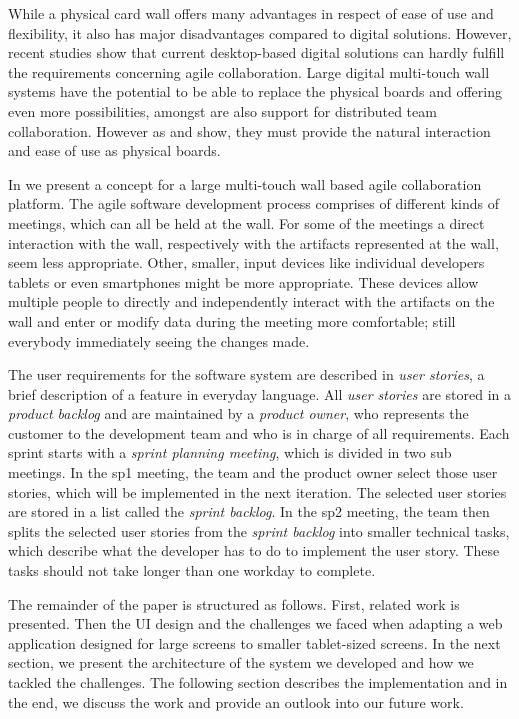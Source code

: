 \documentclass{sigchi}
\begin{document}
While a physical card wall offers many advantages in respect of ease of use and flexibility, it also has major disadvantages compared to digital solutions. However, recent studies \cite{udcw:31721, Mateescu:2015} show that current desktop-based digital solutions can hardly fulfill the requirements concerning agile collaboration.
Large digital multi-touch wall systems have the potential to be able to replace the physical boards and offering even more possibilities, amongst are also support for distributed team collaboration. However as \cite{udcw:31721} and \cite{Mateescu:2015} show, they must provide the natural interaction and ease of use as physical boards. 

In \cite{Mateescu:2015} we present a concept for a large multi-touch wall based agile collaboration platform. The agile software development process comprises of different kinds of meetings, which can all be held at the wall. For some of the meetings a direct interaction with the wall, respectively with the artifacts represented at the wall, seem less appropriate. Other, smaller, input devices like individual developers tablets or even smartphones might be more appropriate. These devices allow multiple people to directly and independently interact with the artifacts on the wall and enter or modify data during the meeting more comfortable; still everybody immediately seeing the changes made. 


The user requirements for the software system are described in \textit{user stories}, a brief description of a feature in everyday language.
All \textit{user stories} are stored in a \textit{product backlog} and are maintained by a \textit{product owner}, who represents the customer to the development team and who is in charge of all requirements.
Each sprint starts with a \textit{sprint planning meeting}, which is divided in two sub meetings. In the \gls{sp1} meeting, the team and the product owner select those user stories, which will be implemented in the next iteration.
The selected user stories are stored in a list called the \textit{sprint backlog}.
In the \gls{sp2} meeting, the team then splits the selected user stories from the \textit{sprint backlog} into smaller technical tasks, which describe what the developer has to do to implement the user story. These tasks should not take longer than one workday to complete.


The remainder of the paper is structured as follows.
First, related work is presented.
Then the UI design and the challenges we faced when adapting a web application designed for large screens to smaller tablet-sized screens.
In the next section, we present the architecture of the system we developed and how we tackled the challenges.
The following section describes the implementation and in the end, we discuss the work and provide an outlook into our future work.
\end{document}
